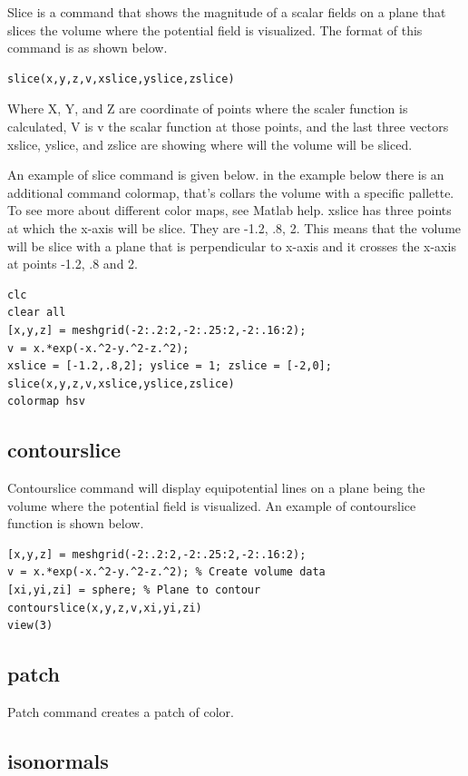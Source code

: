 \documentclass{ximera}
\begin{document}
Slice is a command that shows the magnitude of a scalar fields on a plane that slices the volume where the potential field is visualized. The format of this command is as shown below.

\begin{verbatim}
slice(x,y,z,v,xslice,yslice,zslice)
\end{verbatim}

Where X, Y, and Z are coordinate of points where the scaler function is calculated, V is v the scalar function at those points, and the last three vectors xslice, yslice, and zslice  are showing where will the volume will be sliced.

An example of slice command is given below. in the example below there is an additional command colormap, that's collars the volume with a specific pallette. To see more about different color maps, see Matlab help. xslice has three points at which the x-axis will be slice. They are -1.2, .8, 2. This means that the volume will be slice with a plane that is perpendicular to x-axis and it crosses the x-axis at points -1.2, .8 and 2. 
 
\begin{verbatim}
clc
clear all
[x,y,z] = meshgrid(-2:.2:2,-2:.25:2,-2:.16:2);
v = x.*exp(-x.^2-y.^2-z.^2);
xslice = [-1.2,.8,2]; yslice = 1; zslice = [-2,0];
slice(x,y,z,v,xslice,yslice,zslice)
colormap hsv
\end{verbatim}

\subsection{contourslice}

 Contourslice command will display equipotential  lines on a plane being the volume where the potential field is visualized. An example of contourslice function is shown below.

\begin{verbatim}
[x,y,z] = meshgrid(-2:.2:2,-2:.25:2,-2:.16:2);
v = x.*exp(-x.^2-y.^2-z.^2); % Create volume data
[xi,yi,zi] = sphere; % Plane to contour
contourslice(x,y,z,v,xi,yi,zi)
view(3)
\end{verbatim}

\subsection{patch}

Patch command creates a patch of color.


\subsection{isonormals}
\end{document}
